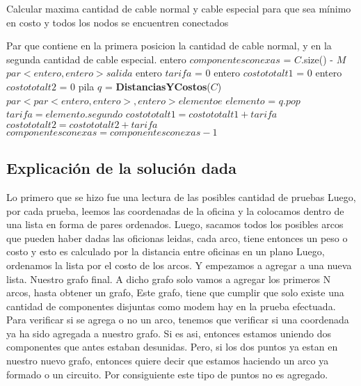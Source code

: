 \documentclass[a4paper,10pt]{article}
\begin{document}
\begin{algorithm}                      %
\caption{Calcular maxima cantidad de cable normal y cable especial para que sea mínimo en costo y todos los nodos se encuentren conectados}          %
\label{Problema 1}                           %
\begin{algorithmic}[1]                    %
    \ENSURE Par que contiene en la primera posicion la cantidad de cable normal, y en la segunda cantidad de cable especial.
    \STATE entero {$componentesconexas$} = {$C$.size() - $M$}
    \STATE $par < entero , entero >  salida $ 
    \STATE entero $tarifa$ = 0
    \STATE entero $costototalt1$ = 0
    \STATE entero $costototalt2$ = 0
    \STATE pila {$q$} = {\bf DistanciasYCostos}{({$C$})}
    \STATE $par < par < entero , entero > , entero > elemento e$
      \STATE $elemento$ = $q.pop$
	  \STATE $tarifa = elemento.segundo$
	    \STATE $costototalt1  = costototalt1 + tarifa$
	  \ELSE	
	    \STATE $costototalt2 = costototalt2 + tarifa$
	  \ENDIF
	  \STATE $componentesconexas = componentesconexas - 1$
	\ENDIF
    \ENDFOR
\end{algorithmic}
\end{algorithm}
\subsection{Explicación de la solución dada}
\hspace{2cm}Lo primero que se hizo fue una lectura de las posibles cantidad de pruebas
Luego, por cada prueba, leemos las coordenadas de la oficina y la colocamos dentro de una lista en forma de pares ordenados.
Luego, sacamos todos los posibles arcos que pueden haber dadas
las oficionas leidas, cada arco, tiene entonces un peso o costo
y esto es calculado por la distancia entre oficinas en un plano
Luego, ordenamos la lista por el costo de los arcos. Y empezamos a agregar a una nueva lista. Nuestro grafo final.
A dicho grafo solo vamos a agregar los primeros N arcos, hasta obtener un grafo, Este grafo, tiene que cumplir que solo existe una cantidad de componentes disjuntas como modem hay en la prueba efectuada.
Para verificar si se agrega o no un arco, tenemos que verificar si una coordenada ya ha sido agregada a nuestro grafo. Si es asi, entonces estamos uniendo dos componentes que antes estaban desunidas.
Pero, si los dos puntos ya estan en nuestro nuevo grafo, entonces quiere decir que estamos haciendo un arco ya formado o un circuito. Por consiguiente este tipo de puntos no es agregado.
\end{document}

